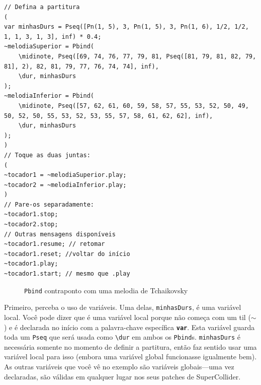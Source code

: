 %

\begin{lstlisting}[style=SuperCollider-IDE, basicstyle=\scttfamily\footnotesize]
// Defina a partitura
(
var minhasDurs = Pseq([Pn(1, 5), 3, Pn(1, 5), 3, Pn(1, 6), 1/2, 1/2, 1, 1, 3, 1, 3], inf) * 0.4;
~melodiaSuperior = Pbind(
	\midinote, Pseq([69, 74, 76, 77, 79, 81, Pseq([81, 79, 81, 82, 79, 81], 2), 82, 81, 79, 77, 76, 74, 74], inf),
	\dur, minhasDurs
);
~melodiaInferior = Pbind(
	\midinote, Pseq([57, 62, 61, 60, 59, 58, 57, 55, 53, 52, 50, 49, 50, 52, 50, 55, 53, 52, 53, 55, 57, 58, 61, 62, 62], inf),
	\dur, minhasDurs
);
)
// Toque as duas juntas:
(
~tocador1 = ~melodiaSuperior.play;
~tocador2 = ~melodiaInferior.play;
)
// Pare-os separadamente:
~tocador1.stop;
~tocador2.stop;
// Outras mensagens disponíveis
~tocador1.resume; // retomar
~tocador1.reset; //voltar do início
~tocador1.play;
~tocador1.start; // mesmo que .play
\end{lstlisting}

\begin{figure}[h]
\centerline{}
\caption{\texttt{Pbind} contraponto com uma melodia de Tchaikovsky}
\label{fig:counterpoint}
\end{figure}

Primeiro, perceba o uso de variáveis. Uma delas, \texttt{minhasDurs}, é uma variável local. Você pode dizer que é uma variável local porque não começa com um til ($\sim$) e é declarada no início com a palavra-chave específica \texttt{\textbf{var}}. Esta variável guarda toda um \texttt{Pseq} que será usada como \texttt{\textbackslash dur} em ambos os \texttt{Pbind}s. \texttt{minhasDurs} é necessária somente no momento de definir a partitura, então faz sentido usar uma variável local para isso (embora uma variável global funcionasse igualmente bem). As outras variáveis que você vê no exemplo são variáveis globais---uma vez declaradas, são válidas em qualquer lugar nos seus patches de SuperCollider.

